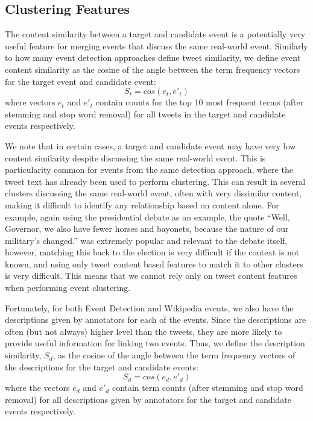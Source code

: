 
\subsection{Clustering Features}
\label{collection:clustering}

The content similarity between a target and candidate event is a potentially very useful feature for merging events that discuss the same real-world event.
Similarly to how many event detection approaches define tweet similarity, we define event content similarity as the cosine of the angle between the term frequency vectors for the target event and candidate event:
\begin{equation}
	S_t = cos(e_t, e'_t)
\end{equation}
where vectors $e_t$ and $e'_t$ contain counts for the top 10 most frequent terms (after stemming and stop word removal) for all tweets in the target and candidate events respectively.

We note that in certain cases, a target and candidate event may have very low content similarity despite discussing the same real-world event.
This is particularity common for events from the same detection approach, where the tweet text has already been used to perform clustering.
This can result in several clusters discussing the same real-world event, often with very dissimilar content, making it difficult to identify any relationship based on content alone.
For example, again using the presidential debate as an example, the quote ``Well, Governor, we also have fewer horses and bayonets, because the nature of our military's changed.'' was extremely popular and relevant to the debate itself, however, matching this back to the election is very difficult if the context is not known, and using only tweet content based features to match it to other clusters is very difficult.
This means that we cannot rely only on tweet content features when performing event clustering.

Fortunately, for both Event Detection and Wikipedia events, we also have the  descriptions given by annotators for each of the events.
Since the descriptions are often (but not always) higher level than the tweets, they are more likely to provide useful information for linking two events.
Thus, we define the description similarity, $S_d$, as the cosine of the angle between the term frequency vectors of the descriptions for the target and candidate events:
\begin{equation}
	S_d = cos(e_d, e'_d)
\end{equation}
where the vectors $e_d$ and $e'_d$ contain term counts (after stemming and stop word removal) for all descriptions given by annotators for the target and candidate events respectively.

